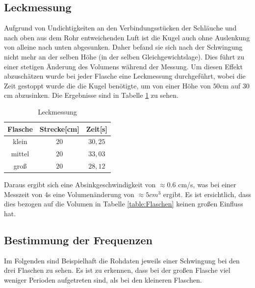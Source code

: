 \documentclass[a4paper, 11pt]{article}
\begin{document}
\subsection{Leckmessung}
Aufgrund von Undichtigkeiten an den Verbindungsstücken der Schläuche und nach oben aus dem Rohr entweichenden Luft ist die Kugel auch ohne Auslenkung von alleine nach unten abgesunken. Daher befand sie sich nach der Schwingung nicht mehr an der selben Höhe (in der selben Gleichgewichtslage). Dies führt zu einer stetigen Änderung des Volumens während der Messung. Um diesen Effekt abzuschätzen wurde bei jeder Flasche eine Leckmessung durchgeführt, wobei die Zeit gestoppt wurde die die Kugel benötigte, um von einer Höhe von $50$cm auf $30$cm abzusinken. Die Ergebnisse sind in Tabelle \ref{table:Leckmessung} zu sehen.

\begin{table}[H]
\centering
\renewcommand{\arraystretch}{1.2}
\begin{tabular}{|c|c|c|}
	\hline Flasche & Strecke[cm] & Zeit[s] \\
	\hline klein & $20$ & $30,25$ \\
	mittel & $20$ & $33,03$ \\
	groß & $20$ & $28,12$ \\
	\hline
\end{tabular}
\label{table:Leckmessung}
\caption{Leckmessung}
\end{table}

Daraus ergibt sich eine Absinkgeschwindigkeit von $\approx 0.6$ cm/s, was bei einer Messzeit von 4s eine Volumenänderung von $\approx 5cm^3$ ergibt. Es ist ersichtlich, dass dies bezogen auf die Volumen in Tabelle \ref{table:Flaschen} keinen großen Einfluss hat.


\subsection{Bestimmung der Frequenzen}
Im Folgenden sind Beispielhaft die Rohdaten jeweils einer Schwingung bei den drei Flaschen zu sehen. Es ist zu erkennen, dass bei der großen Flasche viel weniger Perioden aufgetreten sind, als bei den kleineren Flaschen.
\end{document}
